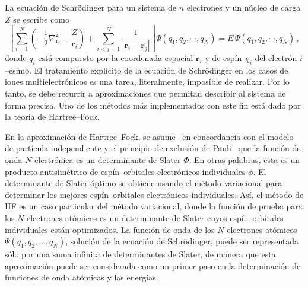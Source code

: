 La ecuación de Schrödinger para un sistema de $n$ electrones y 
un núcleo de carga $Z$ se escribe como
\begin{equation}
\left[
\sum_{i=1}^N \left(-\frac{1}{2}\nabla^2_{{\mathbf r}_i}
                   -\frac{Z}{{\mathbf r}_i}\right) + 
\sum_{i<j=1}^N \frac{1}{|{\mathbf r}_i - {\mathbf r}_j |} 
\right] \Psi\left(q_1,q_2,\cdots,q_N\right) 
= E\, \Psi\left(q_1,q_2,\cdots,q_N\right) 
\, ,
\end{equation}
donde $q_i$ está compuesto por la coordenada espacial $\mathbf{r}_i$ y 
de espín $\chi_i$ del electrón $i$--ésimo. El tratamiento explícito de 
la ecuación de Schr\"odinger en los casos de iones multielectrónicos es 
una tarea, literalmente, imposible de realizar. Por lo tanto, se debe 
recurrir a aproximaciones que permitan describir al sistema de forma 
precisa. Uno de los métodos más implementados con este fin está dado por 
la teoría de Hartree--Fock. 

En la aproximación de Hartree--Fock, se asume --en concordancia con el 
modelo de partícula independiente y el principio de exclusión de Pauli-- 
que la función de onda $N$-electrónica es un determinante de Slater 
$\Phi$. En otras palabras, ésta es un producto antisimétrico de 
espín--orbitales electrónicos individuales $\phi$. El determinante de 
Slater óptimo se obtiene usando el método variacional para determinar 
los mejores espín--orbitales electrónicos individuales. Así, el método 
de HF es un caso particular del método variacional, donde la función de 
prueba para los $N$ electrones atómicos es un determinante de Slater 
cuyos espín--orbitales individuales están optimizados. La función de 
onda de los $N$ electrones atómicos $\Psi(q_1,q_2,\dots,q_N)$, solución 
de la ecuación de Schrödinger, puede ser representada sólo por una suma 
infinita de determinantes de Slater, de manera que esta aproximación 
puede ser considerada como un primer paso en la determinación de 
funciones de onda atómicas y las energías. 

